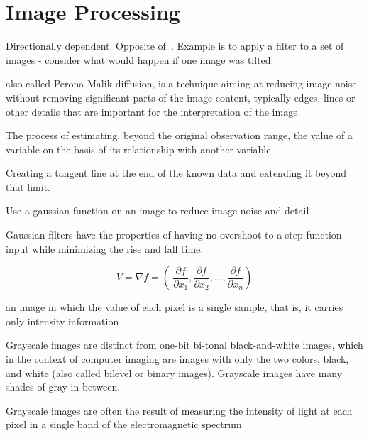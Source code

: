 \section{Image Processing}

\begin{definition}[Anisotropy]\label{anisotropy}
    Directionally dependent. Opposite of~.
    Example is to apply a filter to a set of images - consider
    what would happen if one image was tilted.
\end{definition}

\begin{definition}
    also called Perona-Malik diffusion, is a technique aiming at reducing image
    noise without removing significant parts of the image content, typically
    edges, lines or other details that are important for the interpretation of
    the image.

\end{definition}

\begin{definition}[extrapolation]
    The process of estimating, beyond the original observation range, the value
    of a variable on the basis of its relationship with another variable.

    Creating a tangent line at the end of the known data and extending it
    beyond that limit.

\end{definition}

\begin{definition}
    Use a gaussian function on an image to reduce image noise and detail
\end{definition}

\begin{definition}
    Gaussian filters have the properties of having no overshoot to a step
    function input while minimizing the rise and fall time.

\end{definition}


\begin{definition}
    $$
        V = \nabla{f} = \left(\
        \frac{\partial{f}}{\partial{x_{1}}},
        \frac{\partial{f}}{\partial{x_{2}}},
        \dots,
        \frac{\partial{f}}{\partial{x_{n}}}
    \right)
    $$
\end{definition}

\begin{definition}[Grayscale]
    an image in which the value of each pixel is a single sample, that is, it
    carries only intensity information

    Grayscale images are distinct from one-bit bi-tonal black-and-white images,
    which in the context of computer imaging are images with only the two
    colors, black, and white (also called bilevel or binary images). Grayscale
    images have many shades of gray in between.

    Grayscale images are often the result of measuring the intensity of light
    at each pixel in a single band of the electromagnetic spectrum 

\end{definition}

